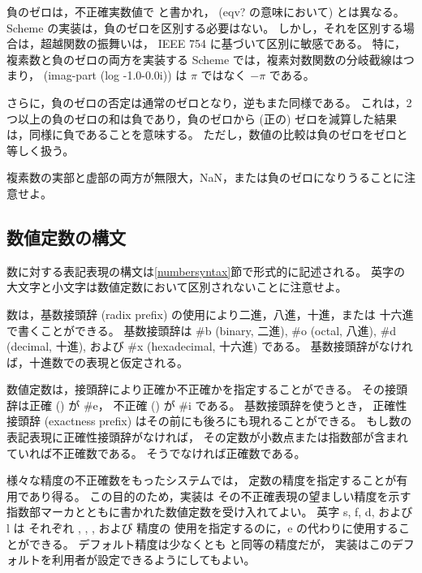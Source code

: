 負のゼロは，不正確実数値で {} と書かれ， ({\cf eqv?} の意味において) {} とは異なる。
Scheme の実装は，負のゼロを区別する必要はない。
しかし，それを区別する場合は，超越関数の振舞いは， IEEE 754 に基づいて区別に敏感である。
特に，複素数と負のゼロの両方を実装する Scheme では，複素対数関数の分岐截線はつまり，
{\cf (imag-part (log -1.0-0.0i))} は $\pi$ ではなく $-\pi$ である。

さらに，負のゼロの否定は通常のゼロとなり，逆もまた同様である。
これは，2つ以上の負のゼロの和は負であり，負のゼロから (正の) ゼロを減算した結果は，同様に負であることを意味する。
ただし，数値の比較は負のゼロをゼロと等しく扱う。

複素数の実部と虚部の両方が無限大，NaN，または負のゼロになりうることに注意せよ。

\subsection{数値定数の構文}
\label{numbernotations}

数に対する表記表現の構文は\ref{numbersyntax}節で形式的に記述される。
英字の大文字と小文字は数値定数において区別されないことに注意せよ。

数は，基数接頭辞 (radix prefix) の使用により二進，八進，十進，または
十六進で書くことができる。
基数接頭辞は {\cf \#b} (binary, 二進), 
{\cf \#o} (octal, 八進), 
{\cf \#d} (decimal, 十進), 
および {\cf \#x} (hexadecimal, 十六進) である。
基数接頭辞がなければ，十進数での表現と仮定される。

数値定数は，接頭辞により正確か不正確かを指定することができる。
その接頭辞は正確 () が {\cf \#e}，
不正確 () が {\cf \#i} である。
基数接頭辞を使うとき，
正確性接頭辞 (exactness prefix) はその前にも後ろにも現れることができる。
もし数の表記表現に正確性接頭辞がなければ，
その定数が小数点または指数部が含まれていれば不正確数である。
そうでなければ正確数である。

様々な精度の不正確数をもったシステムでは，
定数の精度を指定することが有用であり得る。
この目的のため，実装は
その不正確表現の望ましい精度を示す指数部マーカとともに書かれた数値定数を受け入れてよい。
英字 {\cf s}, {\cf f}, {\cf d}, および {\cf l} は
それぞれ , , , および  精度の
使用を指定するのに，{\cf e} の代わりに使用することができる。
デフォルト精度は少なくとも  と同等の精度だが，
実装はこのデフォルトを利用者が設定できるようにしてもよい。

